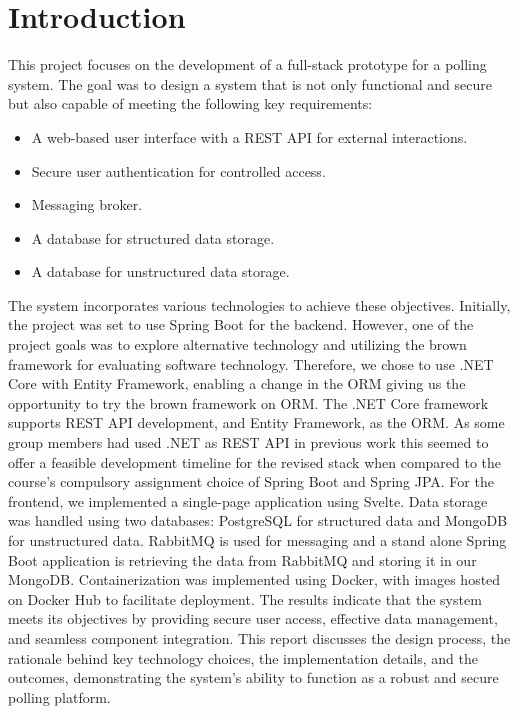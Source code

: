 \section{Introduction}
\label{sec:introduction}

This project focuses on the development of a full-stack prototype for a polling system. 
The goal was to design a system that is not only functional and secure but also capable of meeting the following key requirements:
\begin{itemize} 
    \item A web-based user interface with a REST API for external interactions. 
    \item Secure user authentication for controlled access. 
    \item Messaging broker.
    \item A database for structured data storage. 
    \item A database for unstructured data storage. 
\end{itemize}
The system incorporates various technologies to achieve these objectives. 
Initially, the project was set to use Spring Boot for the backend. 
However, one of the project goals was to explore alternative technology and utilizing the brown framework for evaluating software technology\cite{brown:96}. 
Therefore, we chose to use .NET Core with Entity Framework, enabling a change in the ORM giving us the opportunity to try the brown framework on ORM. 
The .NET Core framework supports REST API development, and Entity Framework, as the ORM. As some group members had used .NET as REST API in previous work this seemed to offer a feasible development timeline for the revised stack when compared to the course's compulsory assignment choice of Spring Boot and Spring JPA.
For the frontend, we implemented a single-page application using Svelte. 
Data storage was handled using two databases: PostgreSQL for structured data and MongoDB for unstructured data.
RabbitMQ is used for messaging and a stand alone Spring Boot application is retrieving the data from RabbitMQ and storing it in our MongoDB.
Containerization was implemented using Docker, with images hosted on Docker Hub to facilitate deployment.
The results indicate that the system meets its objectives by providing secure user access, effective data management, and seamless component integration. 
This report discusses the design process, the rationale behind key technology choices, the implementation details, and the outcomes, demonstrating the system’s ability to function as a robust and secure polling platform.\\
